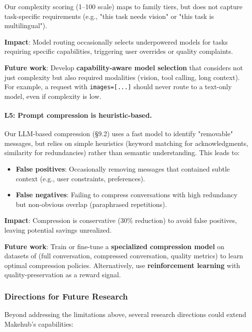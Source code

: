 \documentclass[english]{article}
\begin{document}
Our complexity scoring (1--100 scale) maps to family tiers, but does not capture task-specific requirements (e.g., "this task needs vision" or "this task is multilingual").

\textbf{Impact}: Model routing occasionally selects underpowered models for tasks requiring specific capabilities, triggering user overrides or quality complaints.

\textbf{Future work}: Develop \textbf{capability-aware model selection} that considers not just complexity but also required modalities (vision, tool calling, long context). For example, a request with \texttt{images=[...]} should never route to a text-only model, even if complexity is low.

\paragraph{L5: Prompt compression is heuristic-based.}

Our LLM-based compression (§9.2) uses a fast model to identify "removable" messages, but relies on simple heuristics (keyword matching for acknowledgments, similarity for redundancies) rather than semantic understanding. This leads to:
\begin{itemize}
    \item \textbf{False positives}: Occasionally removing messages that contained subtle context (e.g., user constraints, preferences).
    \item \textbf{False negatives}: Failing to compress conversations with high redundancy but non-obvious overlap (paraphrased repetitions).
\end{itemize}

\textbf{Impact}: Compression is conservative (30\% reduction) to avoid false positives, leaving potential savings unrealized.

\textbf{Future work}: Train or fine-tune a \textbf{specialized compression model} on datasets of (full conversation, compressed conversation, quality metrics) to learn optimal compression policies. Alternatively, use \textbf{reinforcement learning} with quality-preservation as a reward signal.

\subsubsection{Directions for Future Research}

Beyond addressing the limitations above, several research directions could extend Makehub's capabilities:
\end{document}
